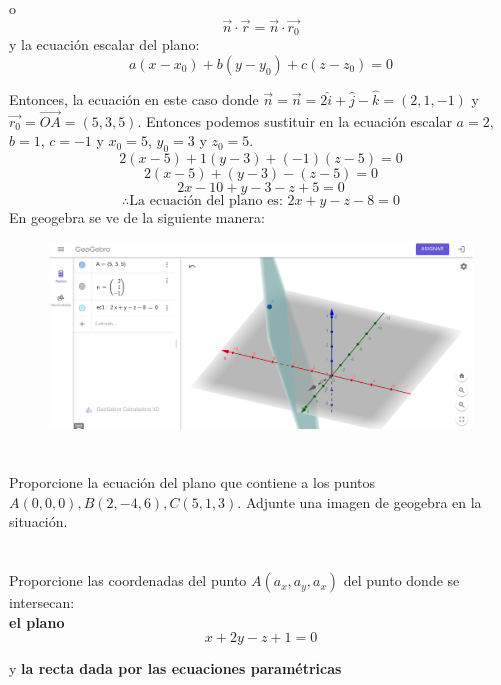 \documentclass[12pt]{article}
\begin{document}
\begin{itemize}
o
\[
\vec{n} \cdot \vec{r} = \vec{n} \cdot \vec{r_0}
\]
y la ecuación escalar del plano:
\[
a(x-x_0) + b(y-y_0)+c(z-z_0) = 0
\]

Entonces, la ecuación en este caso donde $\vec{n} = \vec{n}=2\hat{i} + \hat{j} - \hat{k} = (2, 1, -1)$ y $\vec{r_0}= \vec{OA} = (5,3,5)$. Entonces podemos sustituir en la ecuación escalar $a=2$, $b=1$, $c=-1$ y $x_0=5$, $y_0=3$ y $z_0=5$.
\[
2(x-5) + 1(y-3)+(-1)(z-5) = 0
\]
\[
2(x-5) +(y-3)-(z-5) = 0
\]
\[
2x-10 +y-3-z+5 = 0
\]
\[
\therefore \text{La ecuación del plano es: } 2x+y-z-8 = 0
\]
En geogebra se ve de la siguiente manera:
\begin{figure}[H]
       \centering
       \includegraphics[width=1\textwidth]{./img/planoEc.png}
  \end{figure}
\section{}

Proporcione la ecuación del plano que contiene a los puntos $A(0,0,0) , B(2,-4,6), C(5,1,3)$. Adjunte una imagen de geogebra en la situación.

\section{}

Proporcione las coordenadas del punto $A(a_x,a_y,a_x)$ del punto donde se intersecan:\\

\textbf{el plano} \\

\[ x + 2y -z+1 =0 \]

y \textbf{la recta dada por las ecuaciones paramétricas}


\end{itemize}
\end{document}

